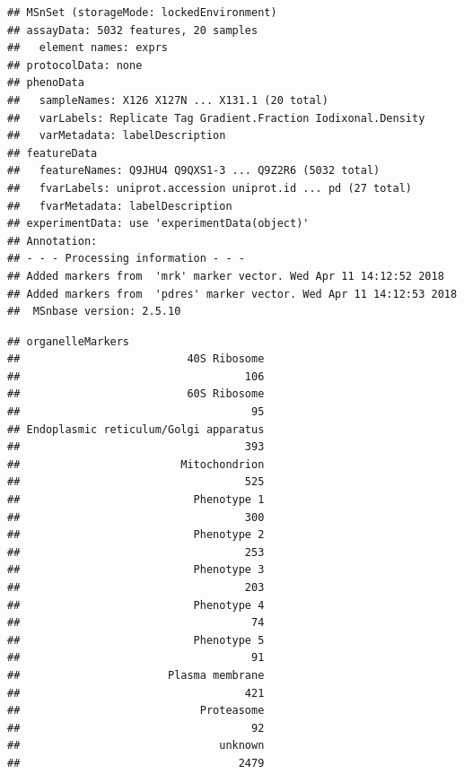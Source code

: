 \begin{knitrout}
\color{fgcolor}\begin{kframe}
\begin{alltt}
\end{alltt}
\begin{verbatim}
## MSnSet (storageMode: lockedEnvironment)
## assayData: 5032 features, 20 samples 
##   element names: exprs 
## protocolData: none
## phenoData
##   sampleNames: X126 X127N ... X131.1 (20 total)
##   varLabels: Replicate Tag Gradient.Fraction Iodixonal.Density
##   varMetadata: labelDescription
## featureData
##   featureNames: Q9JHU4 Q9QXS1-3 ... Q9Z2R6 (5032 total)
##   fvarLabels: uniprot.accession uniprot.id ... pd (27 total)
##   fvarMetadata: labelDescription
## experimentData: use 'experimentData(object)'
## Annotation:  
## - - - Processing information - - -
## Added markers from  'mrk' marker vector. Wed Apr 11 14:12:52 2018 
## Added markers from  'pdres' marker vector. Wed Apr 11 14:12:53 2018 
##  MSnbase version: 2.5.10
\end{verbatim}
\begin{alltt}
  \hlstd{=} \hlstd{)}
\end{alltt}
\begin{verbatim}
## organelleMarkers
##                          40S Ribosome 
##                                   106 
##                          60S Ribosome 
##                                    95 
## Endoplasmic reticulum/Golgi apparatus 
##                                   393 
##                         Mitochondrion 
##                                   525 
##                           Phenotype 1 
##                                   300 
##                           Phenotype 2 
##                                   253 
##                           Phenotype 3 
##                                   203 
##                           Phenotype 4 
##                                    74 
##                           Phenotype 5 
##                                    91 
##                       Plasma membrane 
##                                   421 
##                            Proteasome 
##                                    92 
##                               unknown 
##                                  2479
\end{verbatim}
\end{kframe}
\end{knitrout}

